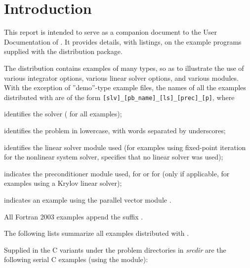 \section{Introduction}\label{s:ex_intro}

This report is intended to serve as a companion document to the User
Documentation of {\cvode} \cite{cvode_ug}.  It provides details, with
listings, on the example programs supplied with the {\cvode} distribution
package.

The {\cvode} distribution contains examples of many types, so as to
illustrate the use of various integrator options, various linear solver
options, and various {\nvector} modules.
With the exception of ''demo''-type example files, the names of all the examples
distributed with {\sundials} are of the form \verb![slv]_[pb_name]_[ls]_[prec]_[p]!,
where
\begin{description}
\item [{[slv]}] identifies the solver ( for all {\cvode} examples);
\item [{[pb\_name]}] identifies the problem in lowercase, with words separated by underscores;
\item [{[ls]}] identifies the linear solver module used (for examples using
  fixed-point iteration for the nonlinear system solver,  specifies
  that no linear solver was used);
\item [{[prec]}] indicates the {\cvode} preconditioner module used,  for {\cvbandpre}
  or  for {\cvbbdpre}
  (only if applicable, for examples using a Krylov linear solver);
\item [{[p]}] indicates an example using the parallel vector module {\nvecp}.
\item All Fortran 2003 examples append the suffix .
\end{description}

\vspace{0.2in}\noindent
The following lists summarize all examples distributed with {\cvode}.

\vspace{0.2in}\noindent
Supplied in the C variants under the problem directories in
{\em srcdir} are the following serial C examples
(using the {\nvecs} module):

